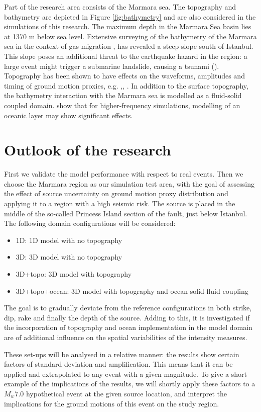 \documentclass[../Text/00main.tex]{subfiles}
\begin{document}
Part of the research area consists of the Marmara sea. The topography and bathymetry are depicted in Figure \ref{fig:bathymetry} and are also considered in the simulations of this research. The maximum depth in the Marmara Sea basin lies at 1370 m below sea level. Extensive surveying of the bathymetry of the Marmara sea \cite{grall2018processed} in the context of gas migration \cite{grall2018upward}, has revealed a steep slope south of Istanbul. This slope poses an additional threat to the earthquake hazard in the region: a large event might trigger a submarine landslide, causing a tsunami (\cite{tappin2002tsunami}). Topography has been shown to have effects on the waveforms, amplitudes and timing of ground motion proxies, e.g. \cite{veeraraghavan_simulation_2020},\cite{zhang2008numerical}, \cite{pienkowska2020high}. In addition to the surface topography, the bathymetry interaction with the Marmara sea is modelled as a fluid-solid coupled domain. \cite{afanasiev2019effect} show that for higher-frequency simulations, modelling of an oceanic layer may show significant effects. 




\section{Outlook of the research}

First we validate the model performance with respect to real events. Then we choose the Marmara region as our simulation test area, with the goal of assessing the effect of source uncertainty on ground motion proxy distribution and applying it to a region with a high seismic risk. The source is placed in the middle of the so-called Princess Island section of the fault, just below Istanbul. The following domain configurations will be considered:

\begin{itemize}
    \item 1D: 1D model with no topography
    \item 3D: 3D model with no topography
    \item 3D+topo: 3D model with topography
    \item 3D+topo+ocean: 3D model with topography and ocean solid-fluid coupling
\end{itemize}


The goal is to gradually deviate from the reference configurations in both strike, dip, rake and finally the depth of the source. Adding to this, it is investigated if the incorporation of topography and ocean implementation in the model domain are of additional influence on the spatial variabilities of the intensity measures. 

These set-ups will be analysed in a relative manner: the results show certain factors of standard deviation and amplification. This means that it can be applied and extrapolated to any event with a given magnitude. To give a short example of the implications of the results, we will shortly apply these factors to a $M_w 7.0$ hypothetical event at the given source location, and interpret the implications for the ground motions of this event on the study region. 
\end{document}
